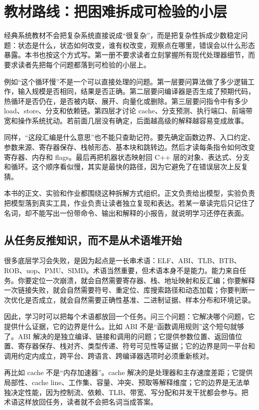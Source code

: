 \section{教材路线：把困难拆成可检验的小层}

经典系统教材不会把复杂系统直接说成“很复杂”，而是把复杂性拆成少数稳定问题：状态是什么，状态如何改变，谁有权改变，观察点在哪里，错误会以什么形态暴露。本书也按这个方式写。第一册不要求读者立刻掌握所有现代处理器细节，而要求读者先把每个问题都落到可检验的小层上。

例如“这个循环慢”不是一个可以直接处理的问题。第一层要问算法做了多少逻辑工作，输入规模是否相同，结果是否正确。第二层要问编译器是否生成了预期代码，热循环是否仍在，是否被内联、展开、向量化或删除。第三层要问指令中有多少 load、store、分支和依赖链。第四层才讨论 cache、分支预测、执行端口、前端带宽和操作系统扰动。若前面几层没有确定，后面越高级的解释越容易变成故事。

同样，“这段汇编是什么意思”也不能只查助记符。要先确定函数边界、入口约定、参数来源、寄存器保存、栈帧形态、基本块和跳转边。然后才读每条指令如何改变寄存器、内存和 flags。最后再把机器状态映射回 C++ 层的对象、表达式、分支和循环。这个顺序看似慢，其实是最快的路径，因为它避免了在错误层次上反复猜。

本书的正文、实验和作业都围绕这种拆解方式组织。正文负责给出模型，实验负责把模型落到真实工具，作业负责让读者独立复现和表达。若某一章读完后只记住了名词，却不能写出一份带命令、输出和解释的小报告，就说明学习还停在表面。

\subsection{从任务反推知识，而不是从术语堆开始}

很多底层学习会失败，是因为起点是一长串术语：ELF、ABI、TLB、BTB、ROB、uop、PMU、SIMD。术语当然重要，但术语本身不是能力。能力来自任务。你要定位一次崩溃，就会自然需要寄存器、栈、地址映射和反汇编；你要解释一次链接失败，就会自然需要符号、重定位、库搜索路径和动态加载；你要判断一次优化是否成立，就会自然需要正确性基准、二进制证据、样本分布和环境记录。

因此，学习时可以把每个术语都放回一个任务。问三个问题：它解决哪个问题，它提供什么证据，它的边界是什么。比如 ABI 不是“函数调用规则”这个短句就够了。ABI 解决的是独立编译、链接和调用的问题；它提供参数位置、返回值位置、寄存器保存、栈对齐、类型传递、符号可见性等证据；它的边界是同一平台和调用约定内成立，跨平台、跨语言、跨编译器选项时必须重新核对。

再比如 cache 不是“内存加速器”。cache 解决的是处理器和主存速度差距；它提供局部性、cache line、工作集、容量、冲突、预取等解释维度；它的边界是无法单独决定性能，因为控制流、依赖、TLB、带宽、写分配和并发干扰都会参与。把术语这样放回任务，读者就不会把名词当成答案。

